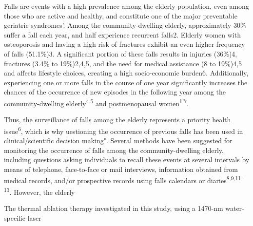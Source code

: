
\begin{multicols}{2}
\par{}Falls are events with a high prevalence among the elderly population, even among those who are active and healthy, and constitute one of the major preventable geriatric syndromes'. Among the community-dwelling elderly, approximately 30\% suffer a fall each year, and half experience recurrent falls2. Elderly women with osteoporosis and having a high risk of fractures exhibit an even higher frequency of falls (51.1\%)3. A significant portion of these falls results in injuries (36\%)4, fractures (3.4\% to 19\%)2,4,5, and the need for medical assistance (8 to 19\%)4,5 and affects lifestyle choices, creating a high socio-economic burden6. Additionally, experiencing one or more falls in the course of one year significantly increases the chances of the occurrence of new episodes in the following year among the community-dwelling elderly\textsuperscript{4,5} and postmenopausal women\textsuperscript{1'7}.
\par{}Thus, the surveillance of falls among the elderly represents a priority health issue\textsuperscript{6},  which is why uestioning the occurrence of previous falls has been used in clinical/scientific decision making". Several methods have been suggested for monitoring the occurrence of falls among the community-dwelling elderly, including questions asking individuals to recall these events at several intervals by means of telephone, face-to-face or mail interviews, information obtained from medical records, and/or prospective records using falls calendars or diaries\textsuperscript{8,9,11-13}. However, the elderly\\

\lipsum


\par{}The thermal ablation therapy investigated in this study, using a 1470-nm water-specific laser


\par{}



\end{multicols}
